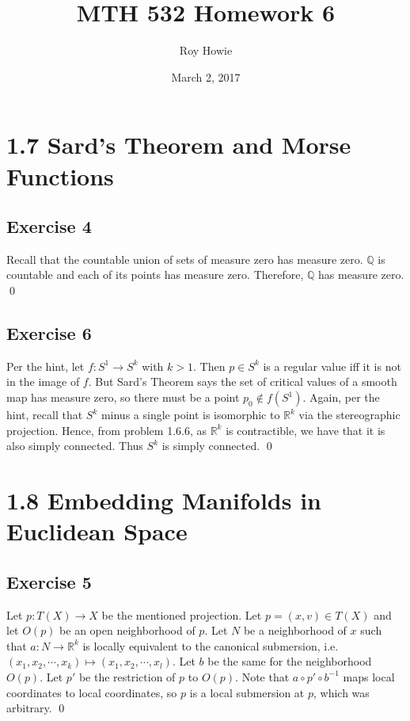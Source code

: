 \documentclass{article}
\newcommand{\Q}{\mathbb{Q}}
\newcommand{\R}{\mathbb{R}}
\begin{document}
\title{\vspace{-2cm}MTH 532 Homework 6}
\author{Roy Howie}
\date{March 2, 2017}
\maketitle

\section*{1.7 Sard's Theorem and Morse Functions}
  \subsection*{Exercise 4}
    Recall that the countable union of sets of measure zero has measure zero.
    $\Q$ is countable and each of its points has measure zero. Therefore, $\Q$
    has measure zero.
    \qed

  \subsection*{Exercise 6}
    Per the hint, let $f\colon S^1\to S^k$ with $k>1$. Then $p\in S^k$ is a
    regular value iff it is not in the image of $f$. But Sard's Theorem says
    the set of critical values of a smooth map has measure zero, so there must
    be a point $p_0\notin f(S^1)$. Again, per the hint, recall that $S^k$ minus
    a single point is isomorphic to $\R^k$ via the stereographic projection.
    Hence, from problem 1.6.6, as $\R^k$ is contractible, we have that it is
    also simply connected. Thus $S^k$ is simply connected.
    \qed

\section*{1.8 Embedding Manifolds in Euclidean Space}
  \subsection*{Exercise 5}
    Let $p\colon T(X)\to X$ be the mentioned projection. Let $p=(x,v)\in T(X)$
    and let $O(p)$ be an open neighborhood of $p$. Let $N$ be a neighborhood of
    $x$ such that $a\colon N\to\R^k$ is locally equivalent to the canonical
    submersion, i.e. $(x_1,x_2,\cdots,x_k)\mapsto(x_1,x_2,\cdots,x_l)$. Let $b$
    be the same for the neighborhood $O(p)$. Let $p'$ be the restriction of $p$
    to $O(p)$. Note that $a\circ p'\circ b^{-1}$ maps local coordinates to local
    coordinates, so $p$ is a local submersion at $p$, which was arbitrary.
    \qed
\end{document}
